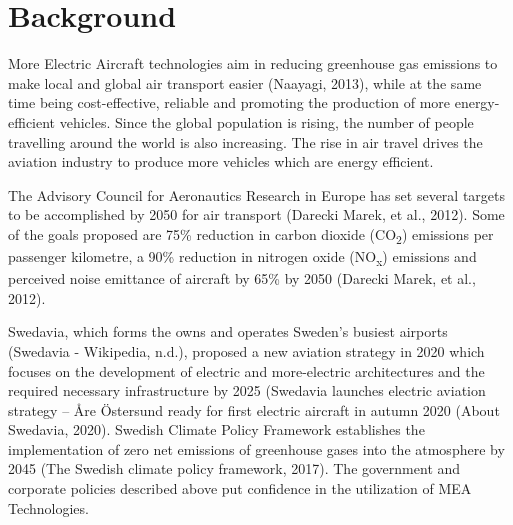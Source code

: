 \documentclass[english]{kththesis}
\begin{document}
\section{Background}
\label{sec:background}
%
More Electric Aircraft technologies aim in reducing greenhouse gas emissions to make local and global air transport easier (Naayagi, 2013), while at the same time being cost-effective, reliable and promoting the production of more energy-efficient vehicles. Since the global population is rising, the number of people travelling around the world is also increasing. The rise in air travel drives the aviation industry to produce more vehicles which are energy efficient.

The Advisory Council for Aeronautics Research in Europe has set several targets to be accomplished by 2050 for air transport (Darecki Marek, et al., 2012). Some of the goals proposed are 75\% reduction in carbon dioxide (CO\textsubscript{2}) emissions per passenger kilometre, a 90\% reduction in nitrogen oxide (NO\textsubscript{x}) emissions and perceived noise emittance of aircraft by 65\% by 2050 (Darecki Marek, et al., 2012). 

Swedavia, which forms the owns and operates Sweden’s busiest airports (Swedavia - Wikipedia, n.d.), proposed a new aviation strategy in 2020 which focuses on the development of electric and more-electric architectures and the required necessary infrastructure by 2025 (Swedavia launches electric aviation strategy – Åre Östersund ready for first electric aircraft in autumn 2020 (About Swedavia, 2020). Swedish Climate Policy Framework establishes the implementation of zero net emissions of greenhouse gases into the atmosphere by 2045 (The Swedish climate policy framework, 2017). The government and corporate policies described above put confidence in the utilization of MEA Technologies.
\end{document}
